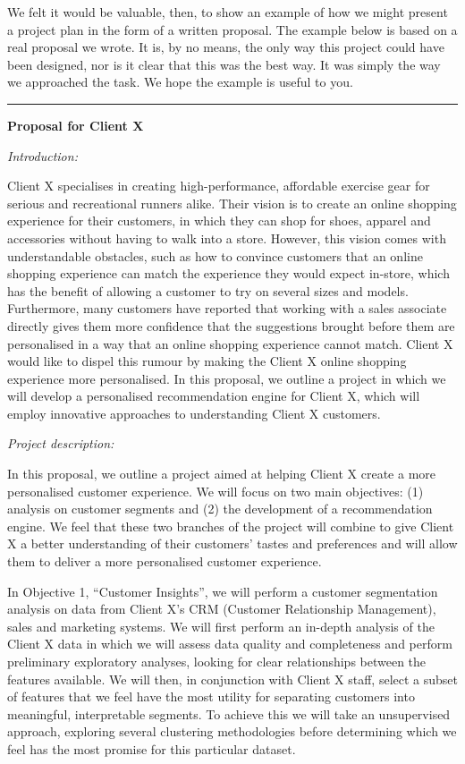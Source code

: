 \documentclass[
]{book}
\begin{document}
We felt it would be valuable, then, to show an example of how we might present a project plan in the form of a written proposal. The example below is based on a real proposal we wrote. It is, by no means, the only way this project could have been designed, nor is it clear that this was the best way. It was simply the way we approached the task. We hope the example is useful to you.

\begin{center}\rule{0.5\linewidth}{0.5pt}\end{center}

\textbf{Proposal for Client X}

\emph{Introduction:}

Client X specialises in creating high-performance, affordable exercise gear for serious and recreational runners alike. Their vision is to create an online shopping experience for their customers, in which they can shop for shoes, apparel and accessories without having to walk into a store. However, this vision comes with understandable obstacles, such as how to convince customers that an online shopping experience can match the experience they would expect in-store, which has the benefit of allowing a customer to try on several sizes and models. Furthermore, many customers have reported that working with a sales associate directly gives them more confidence that the suggestions brought before them are personalised in a way that an online shopping experience cannot match. Client X would like to dispel this rumour by making the Client X online shopping experience more personalised. In this proposal, we outline a project in which we will develop a personalised recommendation engine for Client X, which will employ innovative approaches to understanding Client X customers.

\emph{Project description:}

In this proposal, we outline a project aimed at helping Client X create a more personalised customer experience. We will focus on two main objectives: (1) analysis on customer segments and (2) the development of a recommendation engine. We feel that these two branches of the project will combine to give Client X a better understanding of their customers' tastes and preferences and will allow them to deliver a more personalised customer experience.

In Objective 1, ``Customer Insights'', we will perform a customer segmentation analysis on data from Client X's CRM (Customer Relationship Management), sales and marketing systems. We will first perform an in-depth analysis of the Client X data in which we will assess data quality and completeness and perform preliminary exploratory analyses, looking for clear relationships between the features available. We will then, in conjunction with Client X staff, select a subset of features that we feel have the most utility for separating customers into meaningful, interpretable segments. To achieve this we will take an unsupervised approach, exploring several clustering methodologies before determining which we feel has the most promise for this particular dataset.
\end{document}
